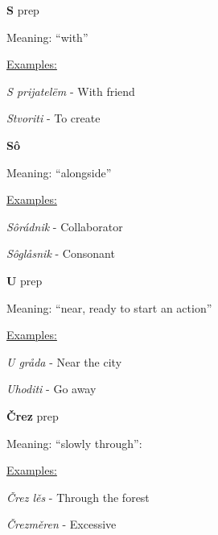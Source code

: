 \textbf{S} \gls{prep}

Meaning: “with”

\underline{Examples:}

\textit{S prijatelëm} - With friend

\textit{Stvoriti} - To create

\textbf{Sô}

Meaning: “alongside”

\underline{Examples:}

\textit{Sôrádnik} - Collaborator

\textit{Sôglåsnik} - Consonant

\textbf{U} \gls{prep}

Meaning: “near, ready to start an action”

\underline{Examples:}

\textit{U gråda} - Near the city

\textit{Uhoditi} - Go away

\textbf{Črez} \gls{prep}

Meaning: “slowly through”:

\underline{Examples:}

\textit{Črez lěs} - Through the forest

\textit{Črezměren} - Excessive
